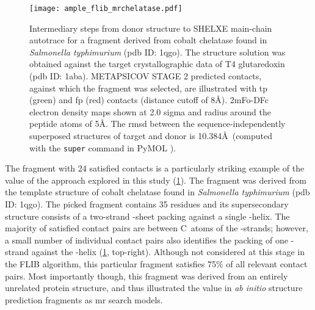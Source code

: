 \begin{figure}[H]
	\centering
	\texttt{[image: ample\_flib\_mrchelatase.pdf]}
	\caption[Example of FLIB fragment to MR solution]{Intermediary steps from donor structure to SHELXE main-chain autotrace for a fragment derived from cobalt chelatase found in \textit{Salmonella typhimurium} (\gls{pdb} ID: 1qgo). The structure solution was obtained against the target crystallographic data of T4 glutaredoxin (\gls{pdb} ID: 1aba). METAPSICOV STAGE 2 predicted contacts, against which the fragment was selected, are illustrated with \acrlong{tp} (green) and \acrlong{fp} (red) contacts (distance cutoff of 8\AA). 2mFo-DFc electron density maps shown at 2.0 sigma and radius around the peptide atoms of 5\AA. The \gls{rmsd} between the sequence-independently superposed structures of target and donor is 10.384\AA\ (computed with the \texttt{super} command in PyMOL \cite{Schrodinger_LLC2015-jz}).}
	\label{fig:ample_flib_mrchelatase}
\end{figure}

The fragment with 24 satisfied contacts is a particularly striking example of the value of the approach explored in this study (\cref{fig:ample_flib_mrchelatase}). The fragment was derived from the template structure of cobalt chelatase found in \textit{Salmonella typhimurium} (\gls{pdb} ID: 1qgo). The picked fragment contains 35 residues and its supersecondary structure consists of a two-strand \textbeta-sheet packing against a single \textalpha-helix. The majority of satisfied contact pairs are between C\textbeta\ atoms of the \textbeta-strands; however, a small number of individual contact pairs also identifies the packing of one \textbeta-strand against the \textalpha-helix (\cref{fig:ample_flib_mrchelatase}, top-right). Although not considered at this stage in the FLIB algorithm, this particular fragment satisfies 75\% of all relevant contact pairs. Most importantly though, this fragment was derived from an entirely unrelated protein structure, and thus illustrated the value in \textit{ab initio} structure prediction fragments as \gls{mr} search models.

